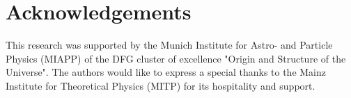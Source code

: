 \chapter{Acknowledgements}

This research was supported by the Munich Institute for Astro- and Particle Physics (MIAPP) of the DFG cluster of excellence "Origin and Structure of the Universe".
The authors would like to express a special thanks to the Mainz Institute for Theoretical Physics (MITP) for its hospitality and support. 
